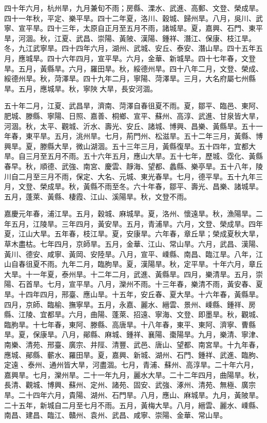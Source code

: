 \begin{pinyinscope}
四十年六月，杭州旱，九月兼旬不雨；房縣、溧水、武進、高郵、文登、榮成旱。四十一年秋，平定、樂平旱。四十二年夏，洛川、穀城、歸州旱。八月，吳川、武寧、宣平旱。四十三年，太原自正月至五月不雨，諸城旱。夏，嘉興、石門、東平旱，河涸。秋，江夏、武昌、崇陽、黃陂、漢陽、鍾祥、潛江、保康、枝江旱。冬，九江武寧旱。四十四年六月，湖州、武城、安丘、泰安、潛山旱。四十五年五月，應城旱。四十六年四月，宣平旱。六月，金華、新城旱。四十七年春，文登旱。五月，黃縣旱。六月，羅田旱。秋，綏德州旱。四十八年二月，文登、榮成、綏德州旱。秋，菏澤旱。四十九年二月，寧陽、菏澤旱。三月，大名府屬七州縣旱。五月，應城旱。秋，寧陜大旱，長安河涸。

五十年二月，江夏、武昌旱，濟南、菏澤自春徂夏不雨。夏，鄒平、臨邑、東阿、肥城、滕縣、寧陽、日照、嘉善、桐鄉、宣平、蘇州、高淳、武進、甘泉皆大旱，河涸。秋，太平、觀城、沂水、壽光、安丘、諸城、博興、昌樂、黃縣旱。五十一年春，東平旱。五月，洮州旱。七月，荊門州、松滋旱。五十二年三月，黃縣、博興旱。夏，滕縣大旱，微山湖涸。五十三年三月，黃縣復旱。五十四年，宜都大旱。自三月至五月不雨。五十六年五月，應山大旱。五十七年，歷城、霑化、黃縣春早。秋，順德、武強、南宮、慶雲、靜海、望都、蠡縣、樂亭旱。五十八年，陵川自二月至三月不雨，保定、大名、元城、東光春旱。七月，德平旱。五十九年三月，文登、榮成旱。秋，黃縣不雨至冬。六十年春，鄒平、壽光、昌樂、諸城旱。五月，蓬萊、黃縣、棲霞、江山、溪陽旱。秋，文登不雨。

嘉慶元年春，浦江旱。五月，穀城、麻城旱。夏，洛州、懷遠旱。秋，漁陽旱。二年五月，江陵旱。三年四月，黃安旱。五月，青浦旱。六月，文登、榮成旱。四年夏，江山大旱。五年春，枝江旱。夏，安康旱。六年春，章丘旱；榮成夏秋大旱，草木盡枯。七年四月，京師旱。五月，金華、江山、常山旱。六月，武昌、漢陽、黃川、德安、咸寧、黃岡、安陸旱。八月，宣平、嵊縣、南昌、臨江旱。八年，江山自春徂夏不雨。九年二月，臨朐旱。夏，漢陽旱。秋，定平旱。十年六月，章丘大旱。十一年夏，泰州旱。十二年二月，武進、黃縣旱。四月，樂清旱。五月，崇陽、石首旱。七月，宣平旱。八月，灤州不雨。十三年春，樂清不雨，黃安春、夏旱。十四年四月，邢臺、應山旱。十五年，安丘春、夏大旱。十六年春，黃縣旱。四月，京師、臨榆、撫寧旱。五月，永嘉、麗水、縉雲、景州、嵊縣、鍾祥、房縣、江陵、宜都旱。六月，曲陽、蓬萊、招遠、寧海、文登、即墨旱。秋，觀城、臨朐旱。十七年春，東阿、滕縣、高唐旱。十八年春，東平、東阿、濟寧、曹縣旱。夏，保康旱。八月，鄖縣、麻城、鍾祥、襄陽、棗陽旱。九月，樂清、寧津、南樂、清苑、邢臺、廣宗、井陘、清豐、武邑、唐山、望都、南宮旱。十九年春，應城、鄖縣、蘄水、羅田旱。夏，嘉興、新城、湖州、石門、鍾祥、武進、臨朐、定遠、泰州、通州皆大旱，河盡涸。七月，青浦、蘇州、高淳旱。二十年六月，嘉興旱。七月，灤州旱。二十一年九月，麗水大旱。二十二年四月，曲陽旱。秋，長清、觀城、博興、蘇州、定州、諸苑、固安、武強、涿州、清苑、無極、廣宗旱。二十四年六月，貴陽、湖州、石門旱。八月，應山、麻城旱。九月，黃陂旱。二十五年，新城自二月至七月不雨。五月，黃梅大旱。八月，縉雲、麗水、嵊縣、南昌、建昌、臨江、贛州、袁州、武昌、咸寧、崇陽、金華、常山旱。


\end{pinyinscope}
